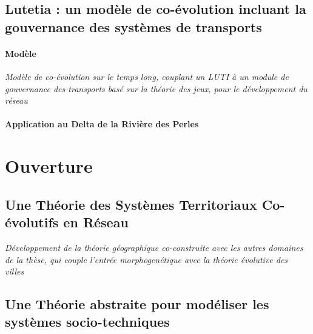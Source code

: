


\subsection{Lutetia : un modèle de co-évolution incluant la gouvernance des systèmes de transports}

\paragraph{Modèle}

\textit{Modèle de co-évolution sur le temps long, couplant un LUTI à un module de gouvernance des transports basé sur la théorie des jeux, pour le développement du réseau~\cite{le2015modeling}}

\paragraph{Application au Delta de la Rivière des Perles}





\section{Ouverture}




\subsection{Une Théorie des Systèmes Territoriaux Co-évolutifs en Réseau}

\textit{Développement de la théorie géographique co-construite avec les autres domaines de la thèse, qui couple l'entrée morphogenétique avec la théorie évolutive des villes~\cite{raimbault:halshs-01422484}}


\subsection{Une Théorie abstraite pour modéliser les systèmes socio-techniques}

